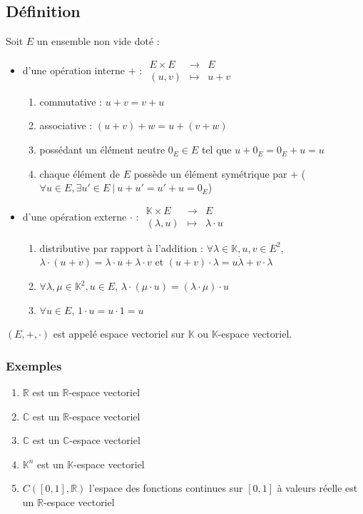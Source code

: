 \documentclass[a4paper,10pt]{book} %
\newcommand{\R}{\mathbb{R}}
\newcommand{\C}{\mathbb{C}}
\newcommand{\K}{\mathbb{K}}
\newcommand{\tq}{~|~}
\begin{document}
\subsection{Définition}
Soit $E$ un ensemble non vide doté :\\
\begin{itemize}
\item d'une opération interne $+$ : $\begin{array}{rcl}E\times E&\rightarrow& E\\ (u,v)&\mapsto &u+v\end{array}$ 
\begin{enumerate}
\item commutative : $u+v=v+u$ 
\item associative : $(u+v)+w=u+(v+w)$
\item possédant un élément neutre $0_E\in E$ tel que $u+0_E=0_E+u=u$
\item chaque élément de $E$ possède un élément symétrique par $+$ ($\forall u\in E, \exists u'\in E \tq u+u'=u'+u=0_E$)
\end{enumerate}
\item d'une opération externe $\cdot$ : $\begin{array}{rcl} \K\times E&\rightarrow& E\\ (\lambda,u)&\mapsto&\lambda\cdot u\end{array}$ 
\begin{enumerate}
\item distributive par rapport à l'addition : $\forall \lambda\in\K, u,v\in E^2$, $\lambda\cdot(u+v)=\lambda \cdot u+\lambda\cdot v$ et $(u+v)\cdot \lambda=u\dot\lambda+v\cdot \lambda$
\item $\forall \lambda,\mu\in\K^2, u\in E$, $\lambda\cdot (\mu\cdot u)=(\lambda\cdot \mu)\cdot u$
\item $\forall u\in E$, $1\cdot u=u\cdot 1=u$
\end{enumerate}
\end{itemize}

$(E,+,\cdot)$ est appelé espace vectoriel sur $\K$ ou $\K$-espace vectoriel.

\subsubsection{Exemples}
\begin{enumerate}
\item $\R$ est un $\R$-espace vectoriel
\item $\C$ est un $\R$-espace vectoriel
\item $\C$ est un $\C$-espace vectoriel
\item $\K^n$ est un $\K$-espace vectoriel
\item $C([0,1],\R)$ l'espace des fonctions continues sur $[0,1]$ à valeurs réelle est un $\R$-espace vectoriel
\end{enumerate}
\end{document}
